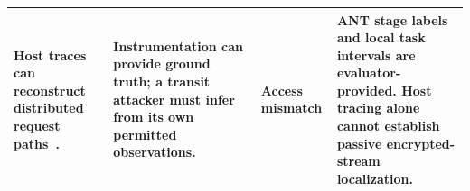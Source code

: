 \begin{table}[t]
\begin{tabularx}{\textwidth}{@{}P{.25\textwidth}P{.29\textwidth}P{.10\textwidth}Y@{}}
Host traces can reconstruct distributed request paths~\cite{reynolds2006wap5,tak2009vpath}. & Instrumentation can provide ground truth; a transit attacker must infer from its own permitted observations. & Access mismatch & ANT stage labels and local task intervals are evaluator-provided. Host tracing alone cannot establish passive encrypted-stream localization. \\\bottomrule
\end{tabularx}
\end{table}
